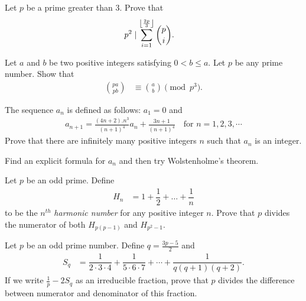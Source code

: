 \documentclass{subfile}
\begin{document}
	\begin{problem}[Putnam 1996] %
		Let $p$ be a prime greater than $3$. Prove that
		\begin{align*}
		p^2
			& \mid \sum_{i=1}^{\left\lfloor\frac{2p}{3}\right\rfloor}\dbinom{p}{i}.
		\end{align*}
	\end{problem}

	\begin{problem} %
		Let $a$ and $b$ be two positive integers satisfying $0<b\leq a.$ Let $p$ be any prime number. Show that
		\begin{align*}
			\binom{pa}{pb}
				& \equiv \binom{a}{b} \pmod{p^3}.
		\end{align*}
	\end{problem}

	\begin{problem} %
		The sequence $a_n$ is defined as follows: $a_1 = 0$ and
		\begin{align*}
		a_{n+1}=\frac{\ensuremath{(4n+2).n^{3}}}{(n+1)^{4}}a_{n}+\frac{3n+1}{(n+1)^{4}} \quad \text{for } n=1,2,3,\cdots
		\end{align*}
		Prove that there are infinitely many positive integers $n$ such that $a_n$ is an integer.
	\end{problem}

	\begin{hint}
		Find an explicit formula for $a_n$ and then try Wolstenholme's theorem.
	\end{hint}

	\begin{problem} %
		Let $p$ be an odd prime. Define
		\begin{align*}
			H_n
				& = 1 + \dfrac{1}{2}+\ldots+\dfrac{1}{n}
		\end{align*}
		to be the $n^{th}$ \textit{harmonic number} for any positive integer $n$. Prove that $p$ divides the numerator of both $H_{p(p-1)}$ and $H_{p^2-1}$.
	\end{problem}

	\begin{problem} %
		Let $p$ be an odd prime number. Define $q = \frac{3p-5}{2}$ and
		\begin{align*}
			S_q
				& = \dfrac{1}{2 \cdot 3 \cdot 4} + \dfrac {1}{5 \cdot 6 \cdot 7} + \cdots + \dfrac{1}{q(q+1)(q+2)}.
		\end{align*}
		If we write $\frac{1}{p} - 2S_q $ as an irreducible fraction, prove that $p$ divides the difference between numerator and denominator of this fraction.
	\end{problem}
\end{document}
